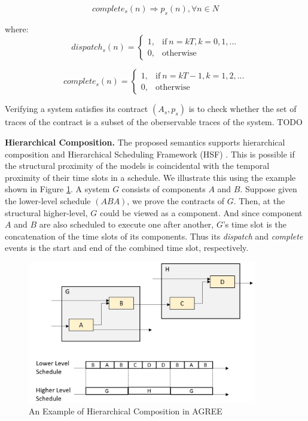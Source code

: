 \begin{equation} 
\label{eqn:sys_assumption}
complete_s(n) \Rightarrow p_s(n), \forall n\in N
\end{equation}

where:
\begin{equation}
\label{eqn:sys_dispatch}
    dispatch_s(n) =
    \begin{cases}
      1, & \text{if}\ n = kT, k=0,1,... \\
      0, & \text{otherwise}
    \end{cases}
\end{equation}

\begin{equation}
\label{eqn:sys_complete}
    complete_s(n) =
    \begin{cases}
      1, & \text{if}\ n = kT-1, k=1,2,... \\
      0, & \text{otherwise}
    \end{cases}
\end{equation}

Verifying a system satisfies its contract $(A_s, p_s)$ is to check whether the set of traces of the contract is a subset of the oberservable traces of the system. TODO

{\bf Hierarchical Composition.}
The proposed semantics supports hierarchical composition and Hierarchical Scheduling Framework (HSF) \cite{HSF}. This is possible if the structural proximity of the models is coincidental with the temporal proximity of their time slots in a schedule. We illustrate this using the example shown in Figure \ref{pic:hierarchy}. A system $G$ consists of components $A$ and $B$. Suppose given the lower-level schedule $(ABA)$, we prove the contracts of $G$. Then, at the structural higher-level, $G$ could be viewed as a component. And since component $A$ and $B$ are also scheduled to execute one after another, $G$'s time slot is the concatenation of the time slots of its components. Thus its \emph{dispatch} and \emph{complete} events is the start and end of the combined time slot, respectively.

\begin{figure}[ht!]
\centering
\includegraphics[width=100mm]{Hierarchy.jpg}
\caption{An Example of Hierarchical Composition in AGREE\label{pic:hierarchy}}
\end{figure}

